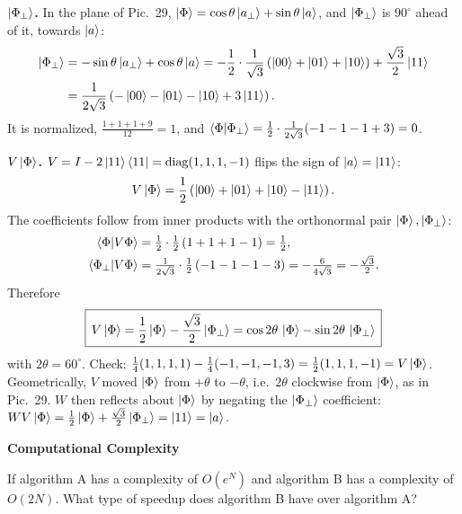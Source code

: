 \documentclass[a4paper, 10pt]{article}
\begin{document}
\begin{solution}
	\noindent \textbf{\( \ket{\Phi_\perp} \).} In the plane of Pic.~29, \( \ket{\Phi} = \cos\theta\ket{a_\perp} + \sin\theta\ket{a} \), and \( \ket{\Phi_\perp} \) is \( 90^\circ \) ahead of it, towards \( \ket{a} \):
	\begin{align*}
		\ket{\Phi_\perp} & = -\sin\theta\ket{a_\perp} + \cos\theta\ket{a}
		= -\frac{1}{2}\cdot\frac{1}{\sqrt{3}}\left(\ket{00} + \ket{01} + \ket{10}\right) + \frac{\sqrt{3}}{2}\ket{11} \\
		                 & = \frac{1}{2\sqrt{3}}\left(-\ket{00} - \ket{01} - \ket{10} + 3\ket{11}\right).
	\end{align*}
	It is normalized, \( \tfrac{1 + 1 + 1 + 9}{12} = 1 \), and \( \braket{\Phi \vert \Phi_\perp} = \tfrac{1}{2}\cdot\tfrac{1}{2\sqrt{3}}(-1 - 1 - 1 + 3) = 0 \).

	\noindent \textbf{\( V\ket{\Phi} \).} \( V = I - 2\ket{11}\bra{11} = \mathrm{diag}(1, 1, 1, -1) \) flips the sign of \( \ket{a} = \ket{11} \):
	\[
		V\ket{\Phi} = \frac{1}{2}\left(\ket{00} + \ket{01} + \ket{10} - \ket{11}\right).
	\]
	The coefficients follow from inner products with the orthonormal pair \( \ket{\Phi}, \ket{\Phi_\perp} \):
	\begin{align*}
		\braket{\Phi \vert V\Phi}       & = \tfrac{1}{2}\cdot\tfrac{1}{2}\left(1 + 1 + 1 - 1\right) = \tfrac{1}{2},                                          \\
		\braket{\Phi_\perp \vert V\Phi} & = \tfrac{1}{2\sqrt{3}}\cdot\tfrac{1}{2}\left(-1 - 1 - 1 - 3\right) = -\tfrac{6}{4\sqrt{3}} = -\tfrac{\sqrt{3}}{2}.
	\end{align*}
	Therefore
	\[
		\boxed{\,V\ket{\Phi} = \frac{1}{2}\ket{\Phi} - \frac{\sqrt{3}}{2}\ket{\Phi_\perp} = \cos 2\theta\,\ket{\Phi} - \sin 2\theta\,\ket{\Phi_\perp}\,}
	\]
	with \( 2\theta = 60^\circ \). Check: \( \tfrac{1}{4}(1, 1, 1, 1) - \tfrac{1}{4}(-1, -1, -1, 3) = \tfrac{1}{2}(1, 1, 1, -1) = V\ket{\Phi} \).
	Geometrically, \( V \) moved \( \ket{\Phi} \) from \( +\theta \) to \( -\theta \), i.e.\ \( 2\theta \) clockwise from \( \ket{\Phi} \), as in Pic.~29.
	\( W \) then reflects about \( \ket{\Phi} \) by negating the \( \ket{\Phi_\perp} \) coefficient: \( WV\ket{\Phi} = \tfrac{1}{2}\ket{\Phi} + \tfrac{\sqrt{3}}{2}\ket{\Phi_\perp} = \ket{11} = \ket{a} \).
\end{solution}

\begin{problem}
\textbf{Computational Complexity}
\par If algorithm A has a complexity of \( O(e^N) \) and algorithm B has a complexity of \( O(2N) \).
What type of speedup does algorithm B have over algorithm A?
\end{problem}
\end{document}
